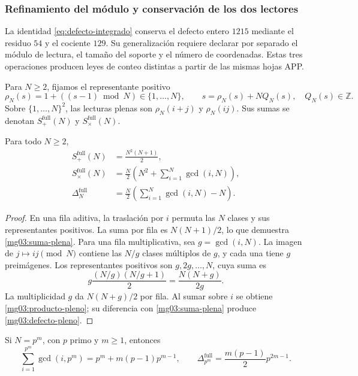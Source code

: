 \subsubsection{Refinamiento del módulo y conservación de los dos lectores}
\label{mg03:refinamiento}

La identidad \eqref{eq:defecto-integrado} conserva el defecto entero
\(1215\) mediante el residuo \(54\) y el cociente \(129\). Su
generalización requiere declarar por separado el módulo de lectura,
el tamaño del soporte y el número de coordenadas. Estas tres operaciones
producen leyes de conteo distintas a partir de las mismas hojas APP.

Para \(N\geq2\), fijamos el representante positivo
\[
 \rho_N(s)=1+((s-1)\bmod N)\in\{1,\ldots,N\},
 \qquad s=\rho_N(s)+NQ_N(s),\quad Q_N(s)\in\mathbb Z.
\]
Sobre \(\{1,\ldots,N\}^2\), las lecturas plenas son
\(\rho_N(i+j)\) y \(\rho_N(ij)\). Sus sumas se denotan
\(S_+^{\mathrm{full}}(N)\) y \(S_\times^{\mathrm{full}}(N)\).

\begin{proposition}
Para todo \(N\geq2\),
\begin{align}
 S_+^{\mathrm{full}}(N)&=\frac{N^2(N+1)}2,
 \label{mg03:suma-plena}\\
 S_\times^{\mathrm{full}}(N)&=
 \frac N2\left(N^2+\sum_{i=1}^{N}\gcd(i,N)\right),
 \label{mg03:producto-pleno}\\
 \Delta_N^{\mathrm{full}}&=
 \frac N2\left(\sum_{i=1}^{N}\gcd(i,N)-N\right).
 \label{mg03:defecto-pleno}
\end{align}
\end{proposition}

\begin{proof}
En una fila aditiva, la traslación por \(i\) permuta las \(N\)
clases y sus representantes positivos. La suma por fila es
\(N(N+1)/2\), lo que demuestra \eqref{mg03:suma-plena}.
Para una fila multiplicativa, sea \(g=\gcd(i,N)\). La imagen de
\(j\mapsto ij\pmod N\) contiene las \(N/g\) clases múltiplos de
\(g\), y cada una tiene \(g\) preimágenes. Los representantes
positivos son \(g,2g,\ldots,N\), cuya suma es
\[
 g\frac{(N/g)(N/g+1)}2=\frac{N(N+g)}{2g}.
\]
La multiplicidad \(g\) da \(N(N+g)/2\) por fila. Al sumar sobre
\(i\) se obtiene \eqref{mg03:producto-pleno}; su diferencia con
\eqref{mg03:suma-plena} produce \eqref{mg03:defecto-pleno}.
\end{proof}

\begin{corollary}
Si \(N=p^m\), con \(p\) primo y \(m\geq1\), entonces
\begin{equation}
 \sum_{i=1}^{p^m}\gcd(i,p^m)
 =p^m+m(p-1)p^{m-1},\qquad
 \Delta_{p^m}^{\mathrm{full}}
 =\frac{m(p-1)}2p^{2m-1}.
 \label{mg03:primo-potencia}
\end{equation}
\end{corollary}

